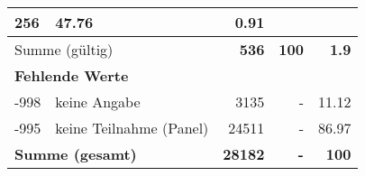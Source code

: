 \begin{longtable}{lXrrr}
       \num{256} &
       \num[round-mode=places,round-precision=2]{47.76} &
         \num[round-mode=places,round-precision=2]{0.91} \\
     \midrule
     \multicolumn{2}{l}{Summe (gültig)} &
       \textbf{\num{536}} &
     \textbf{100} &
       \textbf{\num[round-mode=places,round-precision=2]{1.9}} \\
     \multicolumn{5}{l}{\textbf{Fehlende Werte}}\\
       -998 &
       keine Angabe &
         \num{3135} &
        - &
         \num[round-mode=places,round-precision=2]{11.12} \\
       -995 &
       keine Teilnahme (Panel) &
         \num{24511} &
        - &
         \num[round-mode=places,round-precision=2]{86.97} \\
     \midrule
     \multicolumn{2}{l}{\textbf{Summe (gesamt)}} &
          \textbf{\num{28182}} &
        \textbf{-} &
        \textbf{100} \\
     \bottomrule
     \end{longtable}
     
